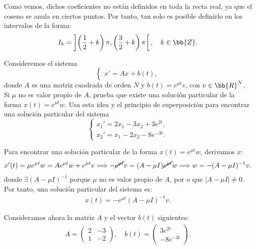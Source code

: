 \begin{ejercicio}
    Como vemos, dichos coeficientes no están definidos en toda la recta real, ya que el coseno se anula en ciertos puntos. Por tanto, tan solo es posible definirlo en los intervalos de la forma:
    \begin{equation*}
        I_k = \left]\left(\frac{1}{2} + k\right)\pi, \left(\frac{3}{2} + k\right)\pi\right[,\quad k\in \bb{Z}.
    \end{equation*}
\end{ejercicio}

\begin{ejercicio}\label{ej:5.4}
    Consideremos el sistema
    \[
        \begin{cases}
            x' = Ax + b(t),
        \end{cases}
    \]
    donde $A$ es una matriz cuadrada de orden $N$ y $b(t) = e^{\mu t}v$, con $v \in \bb{R}^N$. Si $\mu$ no es valor propio de $A$, prueba que existe una solución particular de la forma $x(t) = e^{\mu t}w$. Usa esta idea y el principio de superposición para encontrar una solución particular del sistema
    \[
        \begin{cases}
            x_1' = 2x_1 - 3x_2 + 3e^{2t},\\
            x_2' = x_1 - 2x_2 - 8e^{-3t}.
        \end{cases}
    \]

    Para encontrar una solución particular de la forma $x(t) = e^{\mu t}w$, derivamos $x$:
    \begin{align*}
        x'(t)= \mu e^{\mu t}w
        = A e^{\mu t}w + e^{\mu t}v
        \Longrightarrow
        -\cancel{e^{\mu t}}v = (A - \mu I)\cancel{e^{\mu t}}w
        \Longrightarrow
        w = -(A - \mu I)^{-1}v.
    \end{align*}
    donde $\exists (A - \mu I)^{-1}$ porque $\mu$ no es valor propio de $A$, por o que $|A - \mu I|\neq 0$. Por tanto, una solución particular del sistema es:
    \begin{align*}
        x(t) = -e^{\mu t} (A - \mu I)^{-1}v.
    \end{align*}

    Consideramos ahora la matriz $A$ y el vector $b(t)$ siguientes:
    \begin{align*}
        A = \begin{pmatrix}
            2 & -3\\
            1 & -2
        \end{pmatrix},\quad
        b(t) = \begin{pmatrix}
            3e^{2t}\\
            -8e^{-3t}
        \end{pmatrix}.
    \end{align*}


\end{ejercicio}
